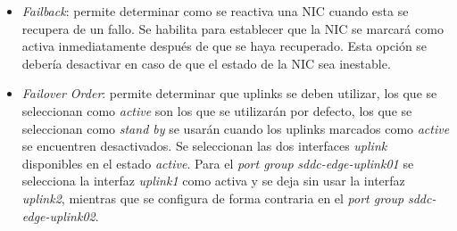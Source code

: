 \begin{itemize}
  \item \textit{Failback}: permite determinar como se reactiva una NIC cuando esta se recupera de un fallo. Se habilita para establecer que la NIC se marcará como activa inmediatamente después de que se haya recuperado. Esta opción se debería desactivar en caso de que el estado de la NIC sea inestable.
  
  \item \textit{Failover Order}: permite determinar que uplinks se deben utilizar, los que se seleccionan como \textit{active} son los que se utilizarán por defecto, los que se seleccionan como \textit{stand by} se usarán cuando los uplinks marcados como \textit{active} se encuentren desactivados. Se seleccionan las dos interfaces \textit{uplink} disponibles en el estado \textit{active}. Para el \textit{port group} \textit{sddc-edge-uplink01} se selecciona la interfaz \textit{uplink1} como activa y se deja sin usar la interfaz \textit{uplink2}, mientras que se configura de forma contraria en el \textit{port group} \textit{sddc-edge-uplink02}.
\end{itemize}